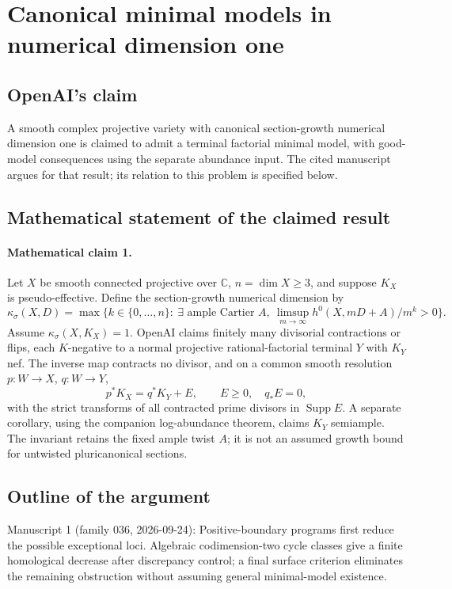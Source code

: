 \documentclass[11pt]{article}
\begin{document}
\section*{Canonical minimal models in numerical dimension one}

\subsection{OpenAI's claim}
A smooth complex projective variety with canonical section-growth numerical dimension one is claimed to admit a terminal factorial minimal model, with good-model consequences using the separate abundance input. The cited manuscript argues for that result; its relation to this problem is specified below.

\subsection{Mathematical statement of the claimed result}
\paragraph{Mathematical claim 1.} Let $X$ be smooth connected projective over $\mathbb C$, $n=\dim X\ge3$, and suppose $K_X$ is pseudo-effective. Define the section-growth numerical dimension by
\[
\kappa_\sigma(X,D)=\max\{k\in\{0,\ldots,n\}:\ \exists\text{ ample Cartier }A,\ \limsup_{m\to\infty}h^0(X,mD+A)/m^k>0\}.
\]
Assume $\kappa_\sigma(X,K_X)=1$. OpenAI claims finitely many divisorial contractions or flips, each $K$-negative to a normal projective rational-factorial terminal $Y$ with $K_Y$ nef. The inverse map contracts no divisor, and on a common smooth resolution $p:W\to X$, $q:W\to Y$,
\[
p^*K_X=q^*K_Y+E,\qquad E\ge0,\quad q_*E=0,
\]
with the strict transforms of all contracted prime divisors in $\operatorname{Supp}E$. A separate corollary, using the companion log-abundance theorem, claims $K_Y$ semiample. The invariant retains the fixed ample twist $A$; it is not an assumed growth bound for untwisted pluricanonical sections.

\subsection{Outline of the argument}
Manuscript 1 (family 036, 2026-09-24): Positive-boundary programs first reduce the possible exceptional loci. Algebraic codimension-two cycle classes give a finite homological decrease after discrepancy control; a final surface criterion eliminates the remaining obstruction without assuming general minimal-model existence.
\end{document}
